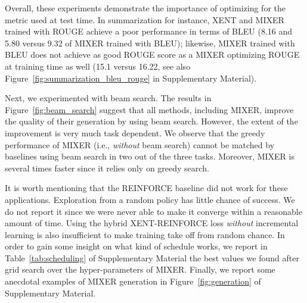 Overall, these experiments demonstrate the importance of optimizing for the metric used at test time. In summarization for instance, XENT and MIXER trained with ROUGE achieve a poor performance in terms of BLEU (8.16 and 5.80 versus 9.32 of MIXER trained with BLEU); likewise, MIXER trained with BLEU does not achieve as good ROUGE score as 
a MIXER optimizing ROUGE at training time as well (15.1 versus 16.22, see also Figure~\ref{fig:summarization_bleu_rouge} in Supplementary Material).

Next, we experimented with beam search. The results in Figure~\ref{fig:beam_search} suggest that all methods, including MIXER, improve the quality of their generation by using beam search. However, the extent of the improvement is very much task dependent. We observe that the greedy performance of MIXER (i.e., {\em without} beam search) cannot be matched by baselines using beam search in two out of the three tasks. Moreover, MIXER is several times faster since it relies only on greedy search.

It is worth mentioning that the REINFORCE baseline did not work for these applications. Exploration from a random policy has little chance of success. We do not report it since we were never able to make it converge within a reasonable amount of time. Using the hybrid XENT-REINFORCE loss {\em without} incremental learning is also insufficient to make training take off from random chance. In order to gain some insight on what kind of schedule works, we report in Table~\ref{tab:scheduling} of Supplementary Material the best values we found after grid search over the hyper-parameters of MIXER.
Finally, we report some anecdotal examples of MIXER generation in Figure~\ref{fig:generation} of Supplementary Material. 
